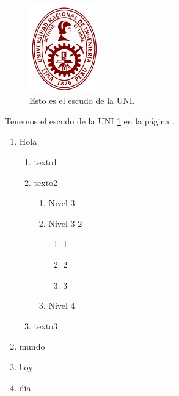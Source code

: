\documentclass{article}
\begin{document}
\begin{figure}[H]
	\centering
	\includegraphics[width=3cm]{logo}
	\caption[Escudo de la UNI]{Esto es el escudo de la UNI.}\label{fig:1}
\end{figure}

\listoffigures
\listoftables

Tenemos el escudo de la UNI \ref{fig:1} en la página \pageref{fig:1}.
\begin{enumerate}
	\item Hola
	\begin{enumerate}
		\item texto1
		\item texto2
		\begin{enumerate}
			\item Nivel 3
			\item Nivel 3 2
			\begin{enumerate}
				\item 1
				\item 2
				\item 3
			\end{enumerate}
			\item Nivel 4
		\end{enumerate}
		\item texto3
	\end{enumerate}
	\item mundo
	\item hoy
	\item día
\end{enumerate}
\end{document}
